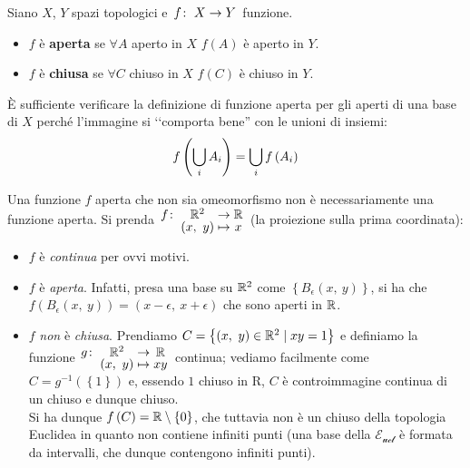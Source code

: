 \begin{define}
Siano $X$, $Y$ spazi topologici e $\funz{f}{X}{Y}$ funzione.
\begin{itemize}
\item $f$ è \textbf{aperta} se $\forall A$ aperto in $X$ $f\left(A\right)$ è aperto in $Y$.
\item $f$ è \textbf{chiusa} se $\forall C$ chiuso in $X$ $f\left(C\right)$ è chiuso in $Y$.
\end{itemize}
\end{define}
\begin{observe}
	È sufficiente verificare la definizione di funzione aperta per gli aperti di una base di $X$ perché l'immagine si ‘‘comporta bene'' con le unioni di insiemi:
	\begin{equation*}
		f\left(\mathop{{\bigcup}}\displaylimits_{i}A_i\right)=\mathop{{\bigcup}}\displaylimits_{i}f\left(A_i\right)
	\end{equation*}
\end{observe}
\begin{attention}
	Una funzione $f$ aperta che non sia omeomorfismo non è necessariamente una funzione aperta. Si prenda $\funztot{f}{\realset^2}{\realset}{\left(x,\ y\right)}{x}$ (la proiezione sulla prima coordinata):
	\begin{itemize}
		\item $f$ è \textit{continua} per ovvi motivi.
		\item $f$ è \textit{aperta}. Infatti, presa una base su $\mathbb{R}^2$ come $\left\{B_{\epsilon}\left(x,\ y\right)\right\}$, si ha che $f\left(B_{\epsilon}\left(x,\ y\right)\right)=\left(x-\epsilon,\ x+\epsilon\right)$ che sono aperti in $\mathbb{R}$.
		\item $f$ \textit{non} è \textit{chiusa}. Prendiamo $C=\left\{\left(x,\ y\right)\in \mathbb{R}^2\mid xy=1 \right\}$ e definiamo la funzione $\funztot{g}{\realset^2}{\realset}{\left(x,\ y\right)}{xy}$ continua; vediamo facilmente come $C=g^{-1}\left(\left\{1\right\}\right)$ e, essendo ${1}$ chiuso in $\mathrm{R}$, $C$ è controimmagine continua di un chiuso e dunque chiuso.\\
		Si ha dunque $f\left(C\right)=\mathbb{R}\setminus\left\{0\right\}$, che tuttavia non è un chiuso della topologia Euclidea in quanto non contiene infiniti punti (una base della $\mathcal{E_{ucl}}$ è formata da intervalli, che dunque contengono infiniti punti).
	\end{itemize}
\end{attention}
